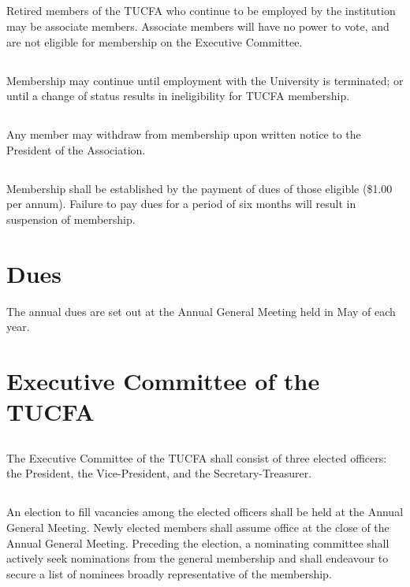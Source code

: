 \documentclass[12pt]{article}
\begin{document}
\subsection{}
Retired members of the TUCFA who continue to be employed by the institution may be associate members. Associate members will have no power to vote, and are not eligible for membership on the Executive Committee.

\subsection{}
Membership may continue until employment with the University is terminated; or until a change of status results in ineligibility for TUCFA membership.

\subsection{}
Any member may withdraw from membership upon written notice to the President of the Association.

\subsection{}

Membership shall be established by the payment of dues of those eligible (\$1.00 per annum). Failure to pay dues for a period of six months will result in suspension of membership.

\section{Dues}

The annual dues are set out at the Annual General Meeting held in May of each year.

\section{Executive Committee of the TUCFA}

\subsection{}
The Executive Committee of the TUCFA shall consist of three elected officers: the President, the Vice-President, and the Secretary-Treasurer.

\subsection{}
An election to fill vacancies among the elected officers shall be held at the Annual General Meeting. Newly elected members shall assume office at the close of the Annual General Meeting. Preceding the election, a nominating committee shall actively seek nominations from the general membership and shall endeavour to secure a list of nominees broadly representative of the membership.
\end{document}
